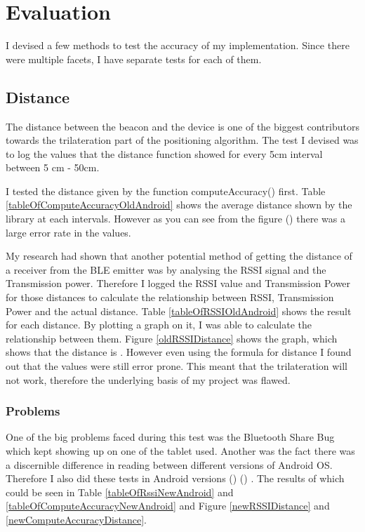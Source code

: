 \section{Evaluation}
I devised a few methods to test the accuracy of my implementation. Since there were multiple facets, I have separate tests for each of them.
\subsection{Distance}
The distance between the beacon and the device is one of the biggest contributors towards the trilateration part of the positioning algorithm. The test I devised was to log the values that the distance function showed for every 5cm interval between 5 cm - 50cm.

I tested the distance given by the function computeAccuracy() first. Table \ref{tableOfComputeAccuracyOldAndroid} shows the average distance shown by the library at each intervals. However as you can see from the figure () there was a large error rate in the values. 

My research had shown that another potential method of getting the distance of a receiver from the BLE emitter was by analysing the RSSI signal and the Transmission power. Therefore I logged the RSSI value and Transmission Power for those distances to calculate the relationship between RSSI, Transmission Power and the actual distance. Table \ref{tableOfRSSIOldAndroid} shows the result for each distance. By plotting a graph on it, I was able to calculate the relationship between them. Figure \ref{oldRSSIDistance} shows the graph, which shows that the distance is .
However even using the formula for distance I found out that the values were still error prone. This meant that the trilateration will not work, therefore the underlying basis of my project was flawed.

\subsubsection{Problems}
One of the big problems faced during this test was the Bluetooth Share Bug\cite{bluetooth-share} which kept showing up on one of the tablet used. Another was the fact there was a discernible difference in reading between different versions of Android OS. Therefore I also did these tests in Android versions () () . The results of which could be seen in Table \ref{tableOfRssiNewAndroid} and \ref{tableOfComputeAccuracyNewAndroid} and Figure \ref{newRSSIDistance} and \ref{newComputeAccuracyDistance}.

